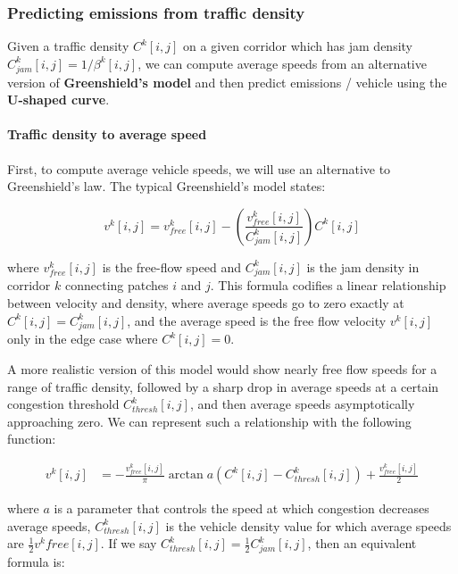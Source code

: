 \documentclass[
]{article}
\begin{document}
\subsubsection{Predicting emissions from traffic
density}\label{predicting-emissions-from-traffic-density}

Given a traffic density \(C^k[i,j]\) on a given corridor which has jam
density \(C^k_{jam}[i,j] = 1 / \beta^k[i,j]\), we can compute average
speeds from an alternative version of \textbf{Greenshield's model} and
then predict emissions / vehicle using the \textbf{U-shaped curve}.

\paragraph{Traffic density to average
speed}\label{traffic-density-to-average-speed}

First, to compute average vehicle speeds, we will use an alternative to
Greenshield's law. The typical Greenshield's model states:


\begin{equation}
    v^k[i,j] = v^k_{free}[i,j] - \left(\frac{v^k_{free}[i,j]}{C^k_{jam}[i,j]}\right) C^k[i,j]
\end{equation}


where \(v^k_{free}[i,j]\) is the free-flow speed and \(C^k_{jam}[i,j]\)
is the jam density in corridor \(k\) connecting patches \(i\) and \(j\).
This formula codifies a linear relationship between velocity and
density, where average speeds go to zero exactly at
\(C^k[i,j] = C^k_{jam}[i,j]\), and the average speed is the free flow
velocity \(v^k[i,j]\) only in the edge case where \(C^k[i,j] = 0\).

A more realistic version of this model would show nearly free flow
speeds for a range of traffic density, followed by a sharp drop in
average speeds at a certain congestion threshold \(C^k_{thresh}[i,j]\),
and then average speeds asymptotically approaching zero. We can
represent such a relationship with the following function:


\begin{align*}
    v^k[i,j] &= - \frac{v^k_{free}[i,j]}{\pi} \arctan{a(C^k[i,j] - C^k_{thresh}[i,j])} + \frac{v^k_{free}[i,j]}{2} 
\end{align*}


where \(a\) is a parameter that controls the speed at which congestion
decreases average speeds, \(C^k_{thresh}[i,j]\) is the vehicle density
value for which average speeds are \(\frac{1}{2} v^k{free}[i,j]\). If we
say \(C^k_{thresh}[i,j] = \frac{1}{2}C^k_{jam}[i,j]\), then an
equivalent formula is:
\end{document}
